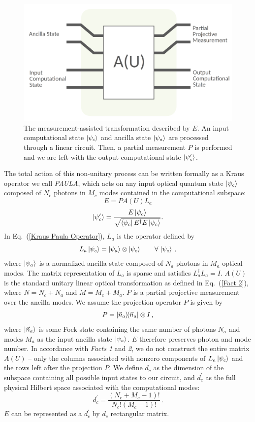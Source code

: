 \documentclass[aps,pra,twocolumn,showpacs,superscriptaddress,floatfix,10pt]{revtex4}
\begin{document}
 \begin{figure}[h]
 	\centering
 	\includegraphics[width=0.5 \textwidth]{./PAULA.pdf}
 	\caption{The measurement-assisted transformation described by $E$. An input computational state $\ket{\psi_c}$ and ancilla state $\ket{\psi_a}$ are processed through a linear circuit. Then, a partial measurement $P$ is performed and we are left with the output computational state $\ket{\psi_c^\prime}$.}
 	\label{Figure - PAULA Operator}
 \end{figure}
The total action of this non-unitary process can be written formally as a Kraus operator we call \textit{PAULA}, which acts on any input optical quantum state $\ket{\psi_{c}}$ composed of $N_c$ photons in $M_c$ modes contained in the computational subspace:
\begin{equation}
\label{Kraus Paula Operator}
E = P A(U) L_a
\end{equation} 
\begin{equation}
\ket{\psi_{c}^\prime} = \frac{E \ket{\psi_{c}}}{\sqrt{ \bra{\psi_c} E^\dagger E \ket{\psi_c} }}.
\end{equation}
In Eq.~(\ref{Kraus Paula Operator}), $L_a$ is the operator defined by
\begin{equation}
\label{Ancilla Linker}
L_a \ket{\psi_{c}} = \ket{\psi_a} \otimes \ket{\psi_{c}} \quad \quad  \forall \, \ket{\psi_{c}} \,,
\end{equation}
where $\ket{\psi_a}$ is a normalized ancilla state composed of $N_a$ photons in $M_a$ optical modes. The matrix representation of $L_a$ is sparse and satisfies $L_a^\dagger L_a = I$.
$A(U)$ is the standard unitary linear optical transformation as defined in Eq.~(\ref{Fact 2}), where $N=N_c+N_a$ and $M=M_c+M_a$. $P$ is a partial projective measurement over the ancilla modes. We assume the projection operator $P$ is given by
\begin{equation}
P = \outerproduct{\vec{n}_a}{\vec{n}_a} \otimes I\,,
\end{equation}
where $\ket{\vec{n}_a}$ is some Fock state 
containing the same number of photons $N_a$ and modes $M_a$ as the input ancilla state $\ket{\psi_a}$. $E$ therefore preserves photon and mode number. In accordance with \textit{Facts 1} and \textit{2}, we do not construct the entire matrix $A(U)$ -- only the columns associated with nonzero components of $L_a \ket{\psi_{c}}$ and the rows left after the projection $P$. We define $d_c$ as the dimension of the subspace containing all possible input states to our circuit, and $d_c^\prime$ as the full physical Hilbert space associated with the computational modes:
\begin{equation}
	d_c^\prime = \frac{(N_c+M_c-1)!}{N_c! (M_c-1)!} \,.
\end{equation}
$E$ can be represented as a $d_c^\prime$ by $d_c$ rectangular matrix.
\end{document}
